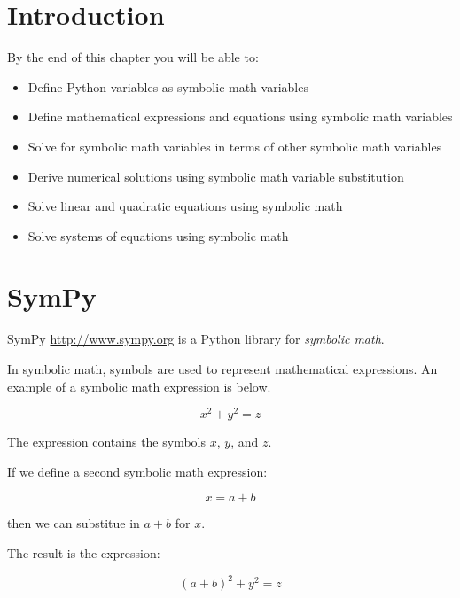 \documentclass{book}
\begin{document}
    
        \hypertarget{introduction}{%
\section{Introduction}\label{introduction}}
    




    
        By the end of this chapter you will be able to:

\begin{itemize}
\item
  Define Python variables as symbolic math variables
\item
  Define mathematical expressions and equations using symbolic math
  variables
\item
  Solve for symbolic math variables in terms of other symbolic math
  variables
\item
  Derive numerical solutions using symbolic math variable substitution
\item
  Solve linear and quadratic equations using symbolic math
\item
  Solve systems of equations using symbolic math
\end{itemize}
        \newpage

    




    
        \hypertarget{sympy}{%
\section{SymPy}\label{sympy}}
    




    
        SymPy \url{http://www.sympy.org} is a Python library for \emph{symbolic
math}.

In symbolic math, symbols are used to represent mathematical
expressions. An example of a symbolic math expression is below.

\[ x^{2} + y^{2} = z \]

The expression contains the symbols \(x\), \(y\), and \(z\).

If we define a second symbolic math expression:

\[ x = a + b \]

then we can substitue in \(a + b\) for \(x\).

The result is the expression:

\[ (a + b)^{2} + y^{2} = z \]
\end{document}
